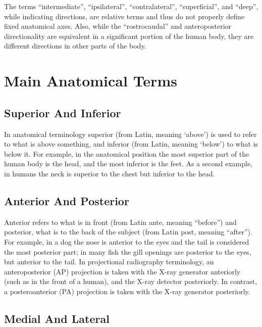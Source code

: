 \documentclass[]{book}
\begin{document}
The terms ``intermediate'', ``ipsilateral'', ``contralateral'', ``superficial'', and ``deep'', while indicating directions, are relative terms and thus do not properly define fixed anatomical axes. Also, while the ``rostrocaudal'' and anteroposterior directionality are equivalent in a significant portion of the human body, they are different directions in other parts of the body.

\hypertarget{main-anatomical-terms}{%
\section{Main Anatomical Terms}\label{main-anatomical-terms}}

\hypertarget{superior-and-inferior}{%
\subsection{Superior And Inferior}\label{superior-and-inferior}}

In anatomical terminology superior (from Latin, meaning `above') is used to refer to what is above something, and inferior (from Latin, meaning `below') to what is below it. For example, in the anatomical position the most superior part of the human body is the head, and the most inferior is the feet. As a second example, in humans the neck is superior to the chest but inferior to the head.

\hypertarget{anterior-and-posterior}{%
\subsection{Anterior And Posterior}\label{anterior-and-posterior}}

Anterior refers to what is in front (from Latin ante, meaning ``before'') and posterior, what is to the back of the subject (from Latin post, meaning ``after''). For example, in a dog the nose is anterior to the eyes and the tail is considered the most posterior part; in many fish the gill openings are posterior to the eyes, but anterior to the tail. In projectional radiography terminology, an anteroposterior (AP) projection is taken with the X-ray generator anteriorly (such as in the front of a human), and the X-ray detector posteriorly. In contrast, a posteroanterior (PA) projection is taken with the X-ray generator posteriorly.

\hypertarget{medial-and-lateral}{%
\subsection{Medial And Lateral}\label{medial-and-lateral}}
\end{document}
